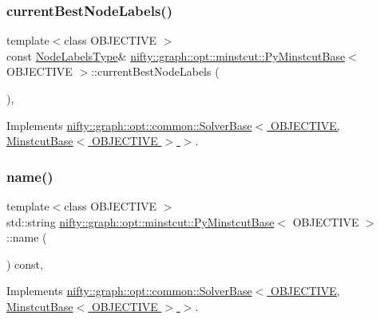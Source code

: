 \subsubsection{\texorpdfstring{current\+Best\+Node\+Labels()}{currentBestNodeLabels()}}
{\footnotesize\ttfamily template$<$class O\+B\+J\+E\+C\+T\+I\+VE $>$ \\
const \hyperlink{classnifty_1_1graph_1_1opt_1_1minstcut_1_1PyMinstcutBase_a9bec148d1b9938c8bb61fc079addda6f}{Node\+Labels\+Type}\& \hyperlink{classnifty_1_1graph_1_1opt_1_1minstcut_1_1PyMinstcutBase}{nifty\+::graph\+::opt\+::minstcut\+::\+Py\+Minstcut\+Base}$<$ O\+B\+J\+E\+C\+T\+I\+VE $>$\+::current\+Best\+Node\+Labels (\begin{DoxyParamCaption}{ }\end{DoxyParamCaption})\hspace{0.3cm}{\ttfamily [inline]}, {\ttfamily [virtual]}}



Implements \hyperlink{classnifty_1_1graph_1_1opt_1_1common_1_1SolverBase_a7bbe01ee201cf3157b251e54c5ff0619}{nifty\+::graph\+::opt\+::common\+::\+Solver\+Base$<$ O\+B\+J\+E\+C\+T\+I\+V\+E, Minstcut\+Base$<$ O\+B\+J\+E\+C\+T\+I\+V\+E $>$ $>$}.

\mbox{\label{classnifty_1_1graph_1_1opt_1_1minstcut_1_1PyMinstcutBase_a2987a843afc3fd9f53333e4fbed08aad}} 
\subsubsection{\texorpdfstring{name()}{name()}}
{\footnotesize\ttfamily template$<$class O\+B\+J\+E\+C\+T\+I\+VE $>$ \\
std\+::string \hyperlink{classnifty_1_1graph_1_1opt_1_1minstcut_1_1PyMinstcutBase}{nifty\+::graph\+::opt\+::minstcut\+::\+Py\+Minstcut\+Base}$<$ O\+B\+J\+E\+C\+T\+I\+VE $>$\+::name (\begin{DoxyParamCaption}{ }\end{DoxyParamCaption}) const\hspace{0.3cm}{\ttfamily [inline]}, {\ttfamily [virtual]}}



Implements \hyperlink{classnifty_1_1graph_1_1opt_1_1common_1_1SolverBase_af638b9a804cfec3e35fe87c77e942d30}{nifty\+::graph\+::opt\+::common\+::\+Solver\+Base$<$ O\+B\+J\+E\+C\+T\+I\+V\+E, Minstcut\+Base$<$ O\+B\+J\+E\+C\+T\+I\+V\+E $>$ $>$}.

